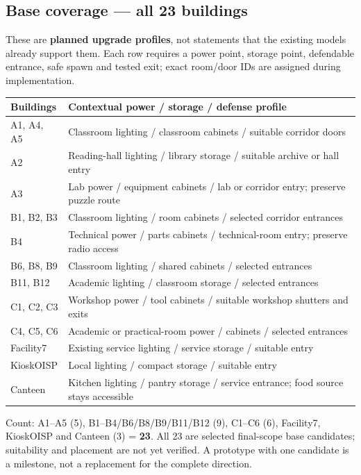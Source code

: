 \subsection{Base coverage --- all 23 buildings}
These are \textbf{planned upgrade profiles}, not statements that the existing models already support them. Each row requires a power point, storage point, defendable entrance, safe spawn and tested exit; exact room/door IDs are assigned during implementation.

\begin{longtable}{@{}p{}p{}@{}}
\toprule
\textbf{Buildings} & \textbf{Contextual power / storage / defense profile} \\ \midrule\endhead
A1, A4, A5 & Classroom lighting / classroom cabinets / suitable corridor doors \\
A2 & Reading-hall lighting / library storage / suitable archive or hall entry \\
A3 & Lab power / equipment cabinets / lab or corridor entry; preserve puzzle route \\
B1, B2, B3 & Classroom lighting / room cabinets / selected corridor entrances \\
B4 & Technical power / parts cabinets / technical-room entry; preserve radio access \\
B6, B8, B9 & Classroom lighting / shared cabinets / selected entrances \\
B11, B12 & Academic lighting / classroom storage / selected entrances \\
C1, C2, C3 & Workshop power / tool cabinets / suitable workshop shutters and exits \\
C4, C5, C6 & Academic or practical-room power / cabinets / selected entrances \\
Facility7 & Existing service lighting / service storage / suitable entry \\
KioskOISP & Local lighting / compact storage / suitable entry \\
Canteen & Kitchen lighting / pantry storage / service entrance; food source stays accessible \\
\bottomrule
\end{longtable}
Count: A1--A5 (5), B1--B4/B6/B8/B9/B11/B12 (9), C1--C6 (6), Facility7, KioskOISP and Canteen (3) = \textbf{23}. All 23 are selected final-scope base candidates; suitability and placement are not yet verified. A prototype with one candidate is a milestone, not a replacement for the complete direction.


